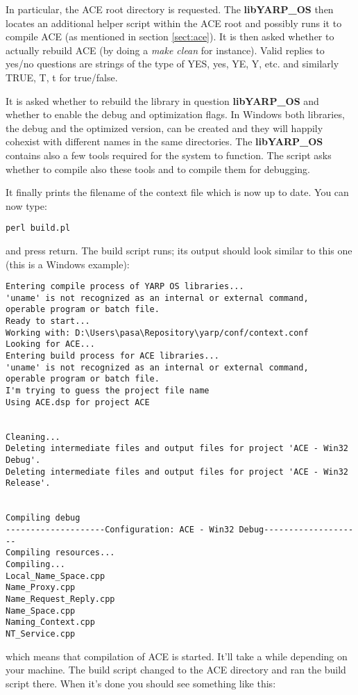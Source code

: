 In particular, the ACE root directory is requested. The {\bf libYARP\_OS} then locates an additional helper script within the ACE root and possibly runs it to compile ACE (as mentioned in section \ref{sect:ace}). It is then asked whether to actually rebuild ACE (by doing a {\em make clean} for instance). Valid replies to yes/no questions are strings of the type of YES, yes, YE, Y, etc. and similarly TRUE, T, t for true/false.

It is asked whether to rebuild the library in question {\bf libYARP\_OS} and whether to enable the debug and optimization flags. In Windows both libraries, the debug and the optimized version, can be created and they will happily cohexist with different names in the same directories. The {\bf libYARP\_OS} contains also a few tools required for the system to function. The script asks whether to compile also these tools and to compile them for debugging.

It finally prints the filename of the context file which is now up to date. You can now type:

\begin{verbatim}
perl build.pl
\end{verbatim}

and press return. The build script runs; its output should look similar to this one (this is a Windows example):

\begin{verbatim}
Entering compile process of YARP OS libraries...
'uname' is not recognized as an internal or external command,
operable program or batch file.
Ready to start...
Working with: D:\Users\pasa\Repository\yarp/conf/context.conf
Looking for ACE...
Entering build process for ACE libraries...
'uname' is not recognized as an internal or external command,
operable program or batch file.
I'm trying to guess the project file name
Using ACE.dsp for project ACE


Cleaning...
Deleting intermediate files and output files for project 'ACE - Win32 Debug'.
Deleting intermediate files and output files for project 'ACE - Win32 Release'.


Compiling debug
--------------------Configuration: ACE - Win32 Debug--------------------
Compiling resources...
Compiling...
Local_Name_Space.cpp
Name_Proxy.cpp
Name_Request_Reply.cpp
Name_Space.cpp
Naming_Context.cpp
NT_Service.cpp

\end{verbatim} 

which means that compilation of ACE is started. It'll take a while depending on your machine. The build script changed to the ACE directory and ran the build script there. When it's done you should see something like this:


